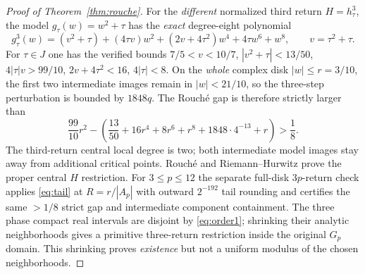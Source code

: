 \begin{proof}[Proof of Theorem~\ref{thm:rouche}]
For the \emph{different} normalized third return
$H=h_\tau^3$, the model $g_\tau(w)=w^2+\tau$
has the \emph{exact} degree-eight polynomial
\[
 g_\tau^3(w)=(v^2+\tau)+(4\tau v)w^2
 +(2v+4\tau^2)w^4+4\tau w^6+w^8,
 \qquad v=\tau^2+\tau.
\]
For $\tau\in J$ one has the verified bounds
$7/5<v<10/7$, $|v^2+\tau|<13/50$,
$4|\tau|v>99/10$, $2v+4\tau^2<16$,
$4|\tau|<8$.  On the \emph{whole}
complex disk $|w|\le r=3/10$,
the first two intermediate images remain in
$|w|<21/10$, so the three-step perturbation
is bounded by $1848q$.  The Rouch\'e gap is
therefore strictly larger than
\[
 \frac{99}{10}r^2-\left(
   \frac{13}{50}+16r^4+8r^6+r^8+
   1848\cdot4^{-13}+r\right)>\frac18.
\]
The third-return central local degree is two;
both intermediate model images stay away from
additional critical points.  Rouch\'e and
Riemann--Hurwitz prove the proper central
$H$ restriction.  For $3\le p\le12$ the
separate full-disk $3p$-return check applies
\eqref{eq:tail} at $R=r/|A_p|$ with outward
$2^{-192}$ tail rounding and certifies the
same $>1/8$ strict gap and intermediate
component containment.
The three phase compact real intervals are
disjoint by \eqref{eq:order1}; shrinking
their analytic neighborhoods gives a
primitive three-return restriction
inside the original $G_p$ domain.  This
shrinking proves \emph{existence} but not
a uniform modulus of the chosen neighborhoods.
\end{proof}
